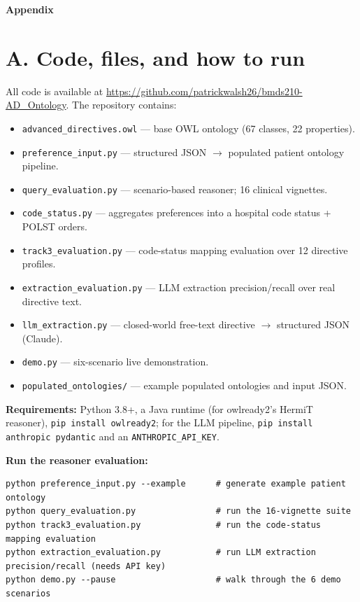 \documentclass[10pt]{article}
\begin{document}
\clearpage
\setcounter{secnumdepth}{0}
\begin{center}{\large\bfseries Appendix}\end{center}

\section{A. Code, files, and how to run}
All code is available at \url{https://github.com/patrickwalsh26/bmds210-AD_Ontology}. The repository contains:

\begin{itemize}[nosep,leftmargin=1.4em]
\item \texttt{advanced\_directives.owl} --- base OWL ontology (67 classes, 22 properties).
\item \texttt{preference\_input.py} --- structured JSON $\rightarrow$ populated patient ontology pipeline.
\item \texttt{query\_evaluation.py} --- scenario-based reasoner; 16 clinical vignettes.
\item \texttt{code\_status.py} --- aggregates preferences into a hospital code status + POLST orders.
\item \texttt{track3\_evaluation.py} --- code-status mapping evaluation over 12 directive profiles.
\item \texttt{extraction\_evaluation.py} --- LLM extraction precision/recall over real directive text.
\item \texttt{llm\_extraction.py} --- closed-world free-text directive $\rightarrow$ structured JSON (Claude).
\item \texttt{demo.py} --- six-scenario live demonstration.
\item \texttt{populated\_ontologies/} --- example populated ontologies and input JSON.
\end{itemize}

\textbf{Requirements:} Python 3.8+, a Java runtime (for owlready2's HermiT reasoner), \texttt{pip install owlready2}; for the LLM pipeline, \texttt{pip install anthropic pydantic} and an \texttt{ANTHROPIC\_API\_KEY}.

\textbf{Run the reasoner evaluation:}
\begin{lstlisting}
python preference_input.py --example      # generate example patient ontology
python query_evaluation.py                # run the 16-vignette suite
python track3_evaluation.py               # run the code-status mapping evaluation
python extraction_evaluation.py           # run LLM extraction precision/recall (needs API key)
python demo.py --pause                    # walk through the 6 demo scenarios
\end{lstlisting}
\end{document}
